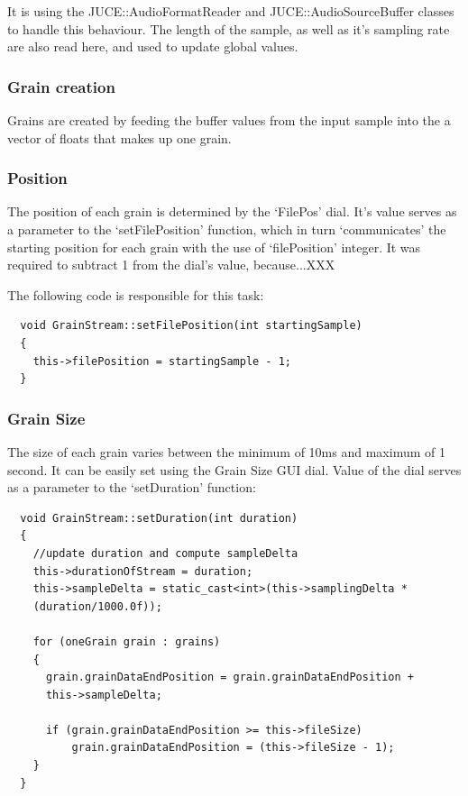 It is using the JUCE::AudioFormatReader and JUCE::AudioSourceBuffer
classes to handle this behaviour. The length of the sample, as well as
it's sampling rate are also read here, and used to update global
values. 

\subsubsection{Grain creation}

Grains are created by feeding the buffer values
from the input sample into the a vector of floats that makes up one
grain.

\subsubsection{Position}
The position of each grain is determined by the `FilePos' dial. It's
value serves as a parameter to the `setFilePosition' function, which
in turn `communicates' the starting position for each grain with the
use of `filePosition' integer. It was required to subtract 1 from the
dial's value, because...XXX

The following code is responsible for
this task:

\begin{lstlisting}
  void GrainStream::setFilePosition(int startingSample)
  {
    this->filePosition = startingSample - 1;
  }
\end{lstlisting}

\subsubsection{Grain Size}
The size of each grain varies between the minimum of 10ms and maximum
of 1 second. It can be easily set using the Grain Size GUI dial. Value
of the dial serves as a parameter to the `setDuration' function:
\begin{lstlisting}
  void GrainStream::setDuration(int duration)
  {
    //update duration and compute sampleDelta
    this->durationOfStream = duration;
    this->sampleDelta = static_cast<int>(this->samplingDelta *
    (duration/1000.0f));

    for (oneGrain grain : grains)
    {
      grain.grainDataEndPosition = grain.grainDataEndPosition +
      this->sampleDelta;

      if (grain.grainDataEndPosition >= this->fileSize)
          grain.grainDataEndPosition = (this->fileSize - 1);
    }
  }
\end{lstlisting}

